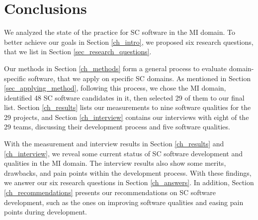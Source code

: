 \chapter{Conclusions}
\label{ch_conclusions}

We analyzed the state of the practice for SC software in the MI domain. To better achieve our goals in Section \ref{ch_intro}, we proposed six research questions, that we list in Section \ref{sec_research_questions}.

Our methods in Section \ref{ch_methods} form a general process to evaluate domain-specific software, that we apply on specific SC domains. As mentioned in Section \ref{sec_applying_method}, following this process, we chose the MI domain, identified 48 SC software candidates in it, then selected 29 of them to our final list. Section \ref{ch_results} lists our measurements to nine software qualities for the 29 projects, and Section \ref{ch_interview} contains our interviews with eight of the 29 teams, discussing their development process and five software qualities.

With the measurement and interview results in Section \ref{ch_results} and \ref{ch_interview}, we reveal some current status of SC software development and qualities in the MI domain. The interview results also show some merits, drawbacks, and pain points within the development process. With these findings, we answer our six research questions in Section \ref{ch_answers}. In addition, Section \ref{ch_recommendations} presents our recommendations on SC software development, such as the ones on improving software qualities and easing pain points during development.

